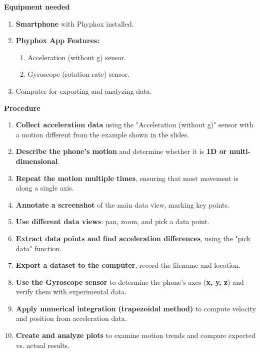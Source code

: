 \documentclass[idxtotoc,hyperref,openany]{labbook} %
\begin{document}
\hfill \break
\textbf{Equipment needed}
\begin{enumerate}[$\bullet$]
    \item \textbf{Smartphone} with Phyphox installed.
    \item \textbf{Phyphox App Features:}
    \begin{enumerate}[$\bullet$]
        \item Acceleration (without g) sensor.
        \item Gyroscope (rotation rate) sensor.
    \end{enumerate}
    \item Computer for exporting and analyzing data.
\end{enumerate}
\textbf{Procedure}
\begin{enumerate}
    \item \textbf{Collect acceleration data} using the "Acceleration (without g)" sensor with a motion different from the example shown in the slides.
    \item \textbf{Describe the phone’s motion} and determine whether it is \textbf{1D or multi-dimensional}.
    \item \textbf{Repeat the motion multiple times}, ensuring that most movement is along a single axis.
    \item \textbf{Annotate a screenshot} of the main data view, marking key points.
    \item \textbf{Use different data views}: pan, zoom, and pick a data point.
    \item \textbf{Extract data points and find acceleration differences}, using the "pick data" function.
    \item \textbf{Export a dataset to the computer}, record the filename and location.
    \item \textbf{Use the Gyroscope sensor} to determine the phone’s axes (\textbf{x, y, z}) and verify them with experimental data.
    \item \textbf{Apply numerical integration (trapezoidal method)} to compute velocity and position from acceleration data.
    \item \textbf{Create and analyze plots} to examine motion trends and compare expected vs. actual results.
\end{enumerate}
\end{document}
